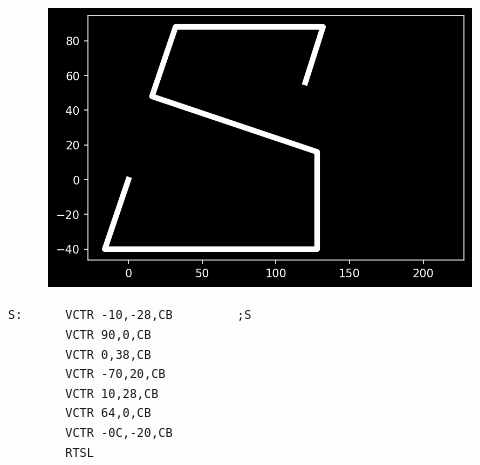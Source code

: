 \begin{minipage}[c]{0.48\linewidth}
\begin{figure}[H]
    \centering
    \begin{adjustbox}{width=4cm,center}
      \includegraphics[width=12cm]{src/titles/letters/S.png}%
    \end{adjustbox}
\end{figure}
\end{minipage}
\begin{minipage}[c]{0.48\linewidth}
\begin{lstlisting}[basicstyle=\scriptsize\ttfamily]
S:      VCTR -10,-28,CB         ;S
        VCTR 90,0,CB
        VCTR 0,38,CB
        VCTR -70,20,CB
        VCTR 10,28,CB
        VCTR 64,0,CB
        VCTR -0C,-20,CB
        RTSL
\end{lstlisting}
\vspace*{\fill}
\end{minipage}

